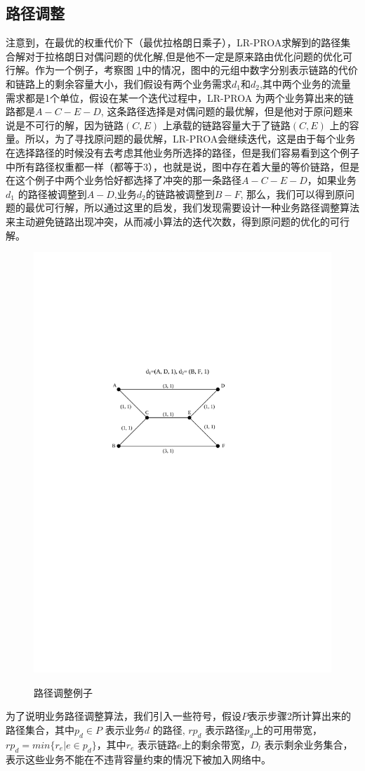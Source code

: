 \subsection{路径调整}
注意到，在最优的权重代价下（最优拉格朗日乘子），LR-PROA求解到的路径集合解对于拉格朗日对偶问题的优化解,但是他不一定是原来路由优化问题的优化可行解。作为一个例子，考察图 \ref{ppt}中的情况，图中的元组中数字分别表示链路的代价和链路上的剩余容量大小，我们假设有两个业务需求$d_1$和$d_2$,其中两个业务的流量需求都是1个单位，假设在某一个迭代过程中，LR-PROA 为两个业务算出来的链路都是$A-C-E-D$, 这条路径选择是对偶问题的最优解，但是他对于原问题来说是不可行的解，因为链路$(C,E)$ 上承载的链路容量大于了链路$(C,E)$ 上的容量。所以，为了寻找原问题的最优解，LR-PROA会继续迭代，这是由于每个业务在选择路径的时候没有去考虑其他业务所选择的路径，但是我们容易看到这个例子中所有路径权重都一样（都等于3），也就是说，图中存在着大量的等价链路，但是在这个例子中两个业务恰好都选择了冲突的那一条路径$A-C-E-D$，如果业务$d_1$ 的路径被调整到$A-D$,业务$d_2$的链路被调整到$B-F$, 那么，我们可以得到原问题的最优可行解，所以通过这里的启发，我们发现需要设计一种业务路径调整算法来主动避免链路出现冲突，从而减小算法的迭代次数，得到原问题的优化的可行解。
\begin{figure}
\setlength{\belowcaptionskip}{-0.1cm}
\begin{center}
{\includegraphics[width=0.4 \textwidth]{figures/PathAdj.pdf}}
\end{center}
\caption{{\footnotesize{路径调整例子}}}
\label{ppt}
\end{figure}
为了说明业务路径调整算法，我们引入一些符号，假设$P$表示步骤2所计算出来的路径集合，其中$p_d\in P$ 表示业务$d$ 的路径, $rp_{d}$ 表示路径$p_d$上的可用带宽，$rp_{d} = min\{r_e | e\in p_d\}$，其中$r_e$ 表示链路$e$上的剩余带宽，$D_l$ 表示剩余业务集合，表示这些业务不能在不违背容量约束的情况下被加入网络中。
